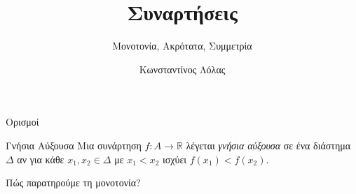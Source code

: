 \documentclass{presentation}
\title{Συναρτήσεις}
\subtitle{Μονοτονία, Ακρότατα, Συμμετρία}
\author[Λόλας]{Κωνσταντίνος Λόλας }
\begin{document}
\begin{frame}
  \titlepage
\end{frame}

\begin{frame}{Ορισμοί}
  \begin{block}{Γνήσια Αύξουσα}
    Μια συνάρτηση $f:A\to\mathbb{R}$ λέγεται \emph{γνήσια αύξουσα} σε ένα διάστημα $Δ$ αν για κάθε $x_1, x_2 \in Δ$ με $x_1 < x_2$ ισχύει $f(x_1) < f(x_2)$.
  \end{block}
\end{frame}

\begin{frame}{Πώς παρατηρούμε τη μονοτονία?}

\end{frame}
\end{document}

